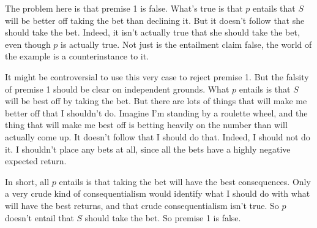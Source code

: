 
{The problem here is that premise 1 is false. What's true is that \(p\) entails that \(S\) will be better off taking the bet than declining it. But it doesn't follow that she should take the bet. Indeed, it isn't actually true that she should take the bet, even though \(p\) is actually true. Not just is the entailment claim false, the world of the example is a counterinstance to it.

It might be controversial to use this very case to reject premise 1. But the falsity of premise 1 should be clear on independent grounds. What \(p\) entails is that \(S\) will be best off by taking the bet. But there are lots of things that will make me better off that I shouldn't do.  Imagine I'm standing by a roulette wheel, and the thing that will make me best off is betting heavily on the number than will actually come up. It doesn't follow that I should do that. Indeed, I should not do it. I shouldn't place any bets at all, since all the bets have a highly negative expected return. 

In short, all \(p\) entails is that taking the bet will have the best consequences. Only a very crude kind of consequentialism would identify what I should do with what will have the best returns, and that crude consequentialism isn't true. So \(p\) doesn't entail that \(S\) should take the bet. So premise 1 is false.}

